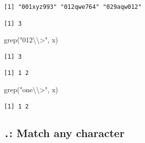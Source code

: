 \documentclass[
]{book}
\newenvironment{Shaded}{\begin{snugshade}}{\end{snugshade}}
\newcommand{\FunctionTok}[1]{\textcolor[rgb]{0.00,0.00,0.00}{#1}}
\newcommand{\NormalTok}[1]{#1}
\newcommand{\OtherTok}[1]{\textcolor[rgb]{0.56,0.35,0.01}{#1}}
\newcommand{\SpecialCharTok}[1]{\textcolor[rgb]{0.00,0.00,0.00}{#1}}
\newcommand{\StringTok}[1]{\textcolor[rgb]{0.31,0.60,0.02}{#1}}
\begin{document}
\begin{verbatim}
[1] "001xyz993" "012qwe764" "029aqw012"
\end{verbatim}

\begin{Shaded}
\end{Shaded}

\begin{verbatim}
[1] 3
\end{verbatim}

\begin{Shaded}
\begin{Highlighting}[]
\FunctionTok{grep}\NormalTok{(}\StringTok{"012}\SpecialCharTok{\textbackslash{}\textbackslash{}}\StringTok{\textgreater{}"}\NormalTok{, x)}
\end{Highlighting}
\end{Shaded}

\begin{verbatim}
[1] 3
\end{verbatim}

\begin{Shaded}
\end{Shaded}

\begin{verbatim}
[1] 1 2
\end{verbatim}

\begin{Shaded}
\begin{Highlighting}[]
\FunctionTok{grep}\NormalTok{(}\StringTok{"one}\SpecialCharTok{\textbackslash{}\textbackslash{}}\StringTok{\textgreater{}"}\NormalTok{, x)}
\end{Highlighting}
\end{Shaded}

\begin{verbatim}
[1] 1 2
\end{verbatim}

\hypertarget{match-any-character}{%
\subsection{\texorpdfstring{\texttt{.}: Match any character}{.: Match any character}}\label{match-any-character}}
\end{document}
